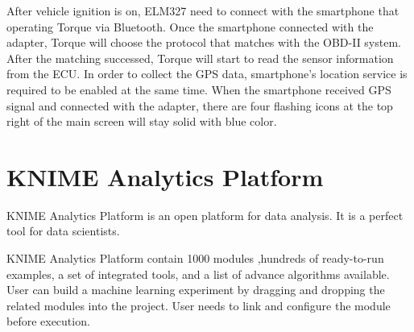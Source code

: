 After vehicle ignition is on, ELM327 need to connect with the smartphone that operating Torque via Bluetooth. Once the smartphone connected with the adapter, Torque will choose the protocol that matches with the OBD-II system. After the matching successed, Torque will start to read the sensor information from the ECU. In order to collect the GPS data, smartphone's location service is required to be enabled at the same time. When the smartphone received GPS signal and connected with the adapter, there are four flashing icons at the top right of the main screen will stay solid with blue color.
 
\section{KNIME Analytics Platform}
KNIME Analytics Platform is an open platform for data analysis. It is a perfect tool for data scientists. 

KNIME Analytics Platform contain 1000 modules ,hundreds of ready-to-run examples, a set of integrated tools, and a list of advance algorithms available. User can build a machine learning experiment by dragging and dropping the related modules into the project. User needs to link and configure the module before execution. 

%
